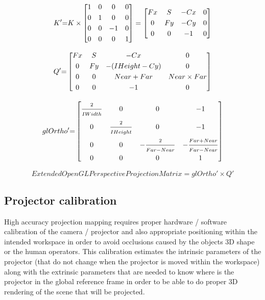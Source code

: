 {	\begin{equation}\label{eq:k2}
		K'{=}
		K
		\times
		\begin{bmatrix}
		1 & 0 & 0 & 0 \\[\smallskipamount]
		0 & 1 & 0 & 0 \\[\smallskipamount]
		0 & 0 & -1 & 0 \\[\smallskipamount]
		0 & 0 & 0 & 1
		\end{bmatrix}
		=
		\begin{bmatrix}
		Fx & S & -Cx & 0 \\[\smallskipamount]
		0 & Fy & -Cy & 0 \\[\smallskipamount]
		0 & 0 & -1 & 0
		\end{bmatrix}
	\end{equation}

	\begin{equation}\label{eq:q2}
		Q'{=}
		\begin{bmatrix}
			Fx & S & -Cx & 0 \\[\smallskipamount]
			0 & Fy & -(IHeight - Cy) & 0 \\[\smallskipamount]
			0 & 0 & Near + Far & Near \times Far \\[\smallskipamount]
			0 & 0 & -1 & 0
		\end{bmatrix}
	\end{equation}

	\begin{equation}\label{eq:glOrtho2}
		glOrtho'{=}
		\begin{bmatrix}
			\vfrac{2}{IWidth} & 0 & 0 & -1 \\[\smallskipamount]
			0 & \vfrac{2}{IHeight} & 0 & -1 \\[\smallskipamount]
			0 & 0 & -\vfrac{2}{Far - Near} & -\vfrac{Far + Near}{Far - Near} \\[\smallskipamount]
			0 & 0 & 0 & 1
		\end{bmatrix}
	\end{equation}

	\begin{equation}\label{eq:projection-matrix}
		ExtendedOpenGLPerspectiveProjectionMatrix = glOrtho' \times Q'
	\end{equation}
}%


\subsection{Projector calibration}

High accuracy projection mapping requires proper hardware / software calibration of the camera / projector and also appropriate positioning within the intended workspace in order to avoid occlusions caused by the objects 3D shape or the human operators. This calibration estimates the intrinsic parameters of the projector (that do not change when the projector is moved within the workspace) along with the extrinsic parameters that are needed to know where is the projector in the global reference frame in order to be able to do proper 3D rendering of the scene that will be projected.

